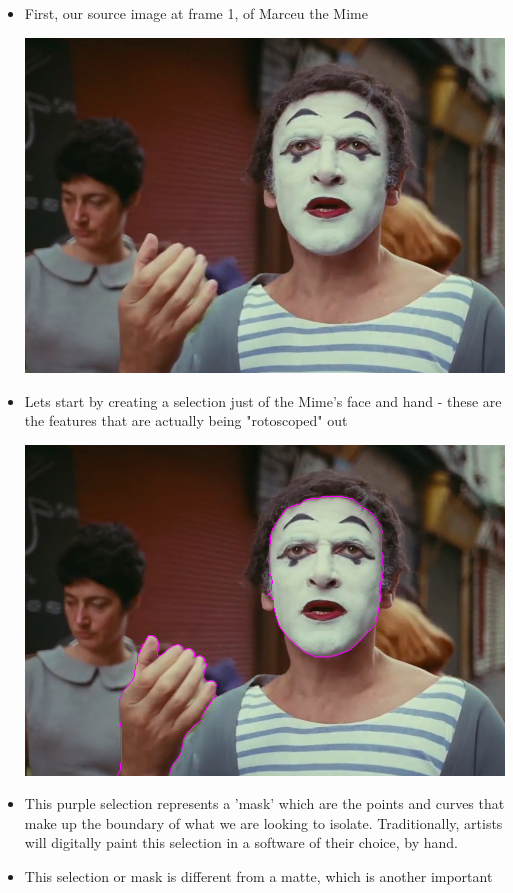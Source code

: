 \documentclass[15pt]{article}
\begin{document}
\begin{itemize}
\item First, our source image at frame 1, of Marceu the Mime
\begin{center}
\includegraphics[width=.9\linewidth]{./roto/Capture.PNG}
\end{center}
\item Lets start by creating a selection just of the Mime's face and hand - these
are the features that are actually being "rotoscoped" out
\begin{center}
\includegraphics[width=.9\linewidth]{./roto/masked.PNG}
\end{center}
\item This purple selection represents a 'mask' which are the points and curves that
make up the boundary of what we are looking to isolate. Traditionally, artists
will digitally paint this selection in a software of their choice, by hand.
\item This selection or mask is different from a matte, which is another important

\end{itemize}
\end{document}
